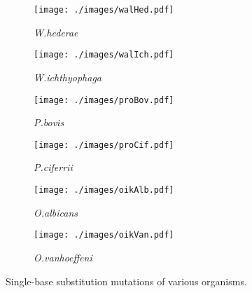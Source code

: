 \documentclass{article}
\begin{document}
\begin{figure}[h!]
\begin{subfigure}{0.32\textwidth}
      \texttt{[image: ./images/walHed.pdf]}
      \caption{\textit{W.hederae}}
      \label{fig:fig1i}
    \end{subfigure}
    \vspace{0.05cm}
    \begin{subfigure}{0.32\textwidth}
      \centering
      \texttt{[image: ./images/walIch.pdf]}
      \caption{\textit{W.ichthyophaga}}
      \label{fig:fig1j}
    \end{subfigure}
    \hfill
    \begin{subfigure}{0.32\textwidth}
      \centering
      \texttt{[image: ./images/proBov.pdf]}
      \caption{\textit{P.bovis}}
      \label{fig:fig1k}
    \end{subfigure}
    \hfill
    \begin{subfigure}{0.32\textwidth}
      \centering
      \texttt{[image: ./images/proCif.pdf]}
      \caption{\textit{P.ciferrii}}
      \label{fig:fig1l}
    \end{subfigure}
    \vspace{0.05cm}
    \begin{subfigure}{0.32\textwidth}
      \centering
      \texttt{[image: ./images/oikAlb.pdf]}
      \caption{\textit{O.albicans}}
      \label{fig:fig1m}
    \end{subfigure}
    \hfill
    \begin{subfigure}{0.32\textwidth}
      \centering
      \texttt{[image: ./images/oikVan.pdf]}
      \caption{\textit{O.vanhoeffeni}}
      \label{fig:fig1n}
    \end{subfigure}
    \caption{Single-base substitution mutations of various organisms.}
    \label{fig:fig1}
\end{figure}


\end{document}

